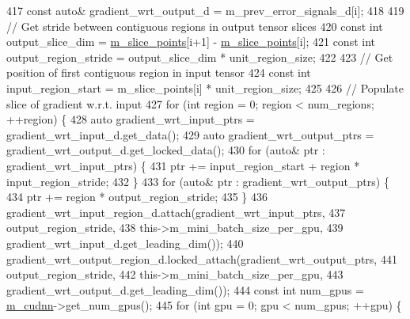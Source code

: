 \begin{DoxyCode}
417       \textcolor{keyword}{const} \textcolor{keyword}{auto}& gradient\_wrt\_output\_d = m\_prev\_error\_signals\_d[i];
418 
419       \textcolor{comment}{// Get stride between contiguous regions in output tensor slices}
420       \textcolor{keyword}{const} \textcolor{keywordtype}{int} output\_slice\_dim = \hyperlink{classlbann_1_1slice__layer_af79dab13a70da2e81209e7ae15166e30}{m\_slice\_points}[i+1] - 
      \hyperlink{classlbann_1_1slice__layer_af79dab13a70da2e81209e7ae15166e30}{m\_slice\_points}[i];
421       \textcolor{keyword}{const} \textcolor{keywordtype}{int} output\_region\_stride = output\_slice\_dim * unit\_region\_size;
422 
423       \textcolor{comment}{// Get position of first contiguous region in input tensor}
424       \textcolor{keyword}{const} \textcolor{keywordtype}{int} input\_region\_start = m\_slice\_points[i] * unit\_region\_size;
425 
426       \textcolor{comment}{// Populate slice of gradient w.r.t. input}
427       \textcolor{keywordflow}{for} (\textcolor{keywordtype}{int} region = 0; region < num\_regions; ++region) \{
428         \textcolor{keyword}{auto} gradient\_wrt\_input\_ptrs = gradient\_wrt\_input\_d.get\_data();
429         \textcolor{keyword}{auto} gradient\_wrt\_output\_ptrs = gradient\_wrt\_output\_d.get\_locked\_data();
430         \textcolor{keywordflow}{for} (\textcolor{keyword}{auto}& ptr : gradient\_wrt\_input\_ptrs) \{
431           ptr += input\_region\_start + region * input\_region\_stride;
432         \}
433         \textcolor{keywordflow}{for} (\textcolor{keyword}{auto}& ptr : gradient\_wrt\_output\_ptrs) \{
434           ptr += region * output\_region\_stride;
435         \}
436         gradient\_wrt\_input\_region\_d.attach(gradient\_wrt\_input\_ptrs,
437                                            output\_region\_stride,
438                                            this->m\_mini\_batch\_size\_per\_gpu,
439                                            gradient\_wrt\_input\_d.get\_leading\_dim());
440         gradient\_wrt\_output\_region\_d.locked\_attach(gradient\_wrt\_output\_ptrs,
441                                                    output\_region\_stride,
442                                                    this->m\_mini\_batch\_size\_per\_gpu,
443                                                    gradient\_wrt\_output\_d.get\_leading\_dim());
444         \textcolor{keyword}{const} \textcolor{keywordtype}{int} num\_gpus = \hyperlink{classlbann_1_1Layer_a08dbb94239e3b8c96329786c57c72e21}{m\_cudnn}->get\_num\_gpus();
445         \textcolor{keywordflow}{for} (\textcolor{keywordtype}{int} gpu = 0; gpu < num\_gpus; ++gpu) \{

\end{DoxyCode}

